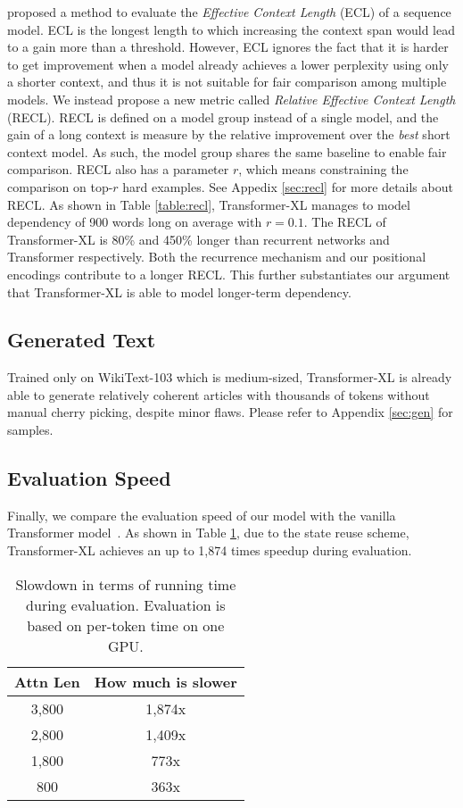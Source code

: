 \documentclass[11pt,a4paper]{article}
\begin{document}
\citet{khandelwal2018sharp} proposed a method to evaluate the \textit{Effective Context Length} (ECL) of a sequence model.
ECL is the longest length to which increasing the context span would lead to a gain more than a threshold.
However, ECL ignores the fact that it is harder to get improvement when a model already achieves a lower perplexity using only a shorter context, and thus it is not suitable for fair comparison among multiple models. We instead propose a new metric called \textit{Relative Effective Context Length} (RECL). RECL is defined on a model group instead of a single model, and the gain of a long context is measure by the relative improvement over the \textit{best} short context model. As such, the model group shares the same baseline to enable fair comparison. RECL also has a parameter $r$, which means constraining the comparison on top-$r$ hard examples. See Appedix \ref{sec:recl} for more details about RECL. As shown in Table \ref{table:recl}, Transformer-XL manages to model dependency of 900 words long on average with $r = 0.1$. The RECL of Transformer-XL is 80\% and 450\% longer than recurrent networks and Transformer respectively. Both the recurrence mechanism and our positional encodings contribute to a longer RECL. This further substantiates our argument that Transformer-XL is able to model longer-term dependency.

\subsection{Generated Text}

Trained only on WikiText-103 which is medium-sized, Transformer-XL is already able to generate relatively coherent articles with thousands of tokens without manual cherry picking, despite minor flaws. Please refer to Appendix \ref{sec:gen} for samples.


\subsection{Evaluation Speed} \label{sec:speed}
Finally, we compare the evaluation speed of our model with the vanilla Transformer model~\cite{al2018character}. As shown in Table \ref{table:speed}, due to the state reuse scheme, Transformer-XL achieves an up to 1,874 times speedup during evaluation.

\begin{table}[t]
	\small
	\centering
	\begin{tabular}{cc}
		\toprule
		\bf Attn Len & \bf How much \citet{al2018character} is slower \\
		\midrule
		3,800 & 1,874x \\
		2,800 & 1,409x \\
		1,800 & 773x \\
		800 & 363x \\
		\bottomrule
	\end{tabular}
	\caption{\small
		Slowdown in terms of running time during evaluation. Evaluation is based on per-token time on one GPU.
	}
	\label{table:speed}
\end{table}
\end{document}
